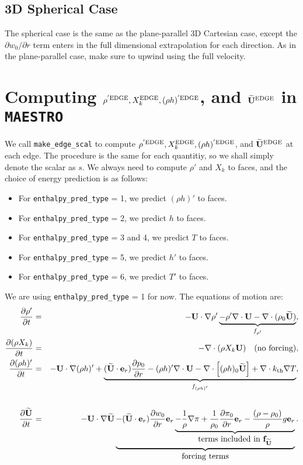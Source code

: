 \newpage

\subsection{3D Spherical Case}
The spherical case is the same as the plane-parallel 3D Cartesian 
case, except the $\partial w_0/\partial r$ term enters 
in the full dimensional extrapolation for each direction.
As in the plane-parallel case, make sure to upwind using the 
full velocity.

\newpage

\section{Computing $\rho^{'\rm EDGE}, X_k^{\rm EDGE},(\rho h)^{'\rm EDGE}$, and $\widetilde{{\bf U}}^{\rm EDGE}$ in {\tt MAESTRO}}\label{Scalar Edge State Prediction in MAESTRO}
We call {\tt make\_edge\_scal} to compute $\rho^{'\rm EDGE}, X_k^{\rm EDGE}, 
(\rho h)^{'\rm EDGE}$, and $\widetilde{{\bf U}}^{\rm EDGE}$ at each edge.
The procedure is the same for each quantitiy, so we shall simply denote 
the scalar as $s$.  We always need to compute $\rho'$ and $X_k$ to faces, 
and the choice of energy prediction is as follows:
\begin{itemize}
\item For {\tt enthalpy\_pred\_type} = 1, we predict $(\rho h)'$ to faces.
\item For {\tt enthalpy\_pred\_type} = 2, we predict $h$ to faces.
\item For {\tt enthalpy\_pred\_type} = 3 and 4, we predict $T$ to faces.
\item For {\tt enthalpy\_pred\_type} = 5, we predict $h'$ to faces.
\item For {\tt enthalpy\_pred\_type} = 6, we predict $T'$ to faces.
\end{itemize}
We are using {\tt enthalpy\_pred\_type} = 1 for now.  The equations
of motion are:
\begin{eqnarray}
\frac{\partial \rho'}{\partial t} &=& -{\bf U}\cdot\nabla\rho' \underbrace{- \rho'\nabla\cdot{\bf U} - \nabla\cdot(\rho_0\widetilde{{\bf U}})}_{f_{\rho'}}, \\
\frac{\partial(\rho X_k)}{\partial t} &=& -\nabla\cdot(\rho X_k{\bf U}) ~~~ \text{(no forcing)}, \\
\frac{\partial(\rho h)'}{\partial t} &=& -{\bf U}\cdot\nabla(\rho h)' + \underbrace{(\widetilde{{\bf U}}\cdot{\bf e}_r)\frac{\partial p_0}{\partial r} -(\rho h)'\nabla\cdot{\bf U} - \nabla\cdot\left[(\rho h)_0\widetilde{{\bf U}}\right] + \nabla\cdot k_{\rm th}\nabla T}_{f_{(\rho h)'}}, \nonumber \\
&& \\
\frac{\partial\widetilde{{\bf U}}}{\partial t} &=& -{\bf U}\cdot\nabla\widetilde{{\bf U}} \underbrace{- (\widetilde{{\bf U}}\cdot{\bf e}_r)\frac{\partial w_0}{\partial r}{\bf e}_r \underbrace{- \frac{1}{\rho}\nabla\pi + \frac{1}{\rho_0}\frac{\partial\pi_0}{\partial r}{\bf e}_r - \frac{(\rho-\rho_0)}{\rho}g{\bf e}_r}_{\hbox{terms included in ${\bf f}_{\widetilde{{\bf U}}}$}}}_{\hbox{forcing terms}}.
\end{eqnarray}

